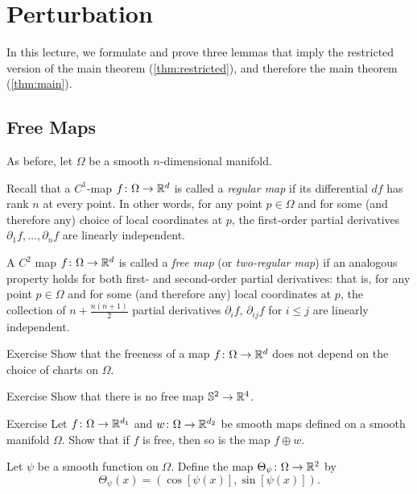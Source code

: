 \chapter{Perturbation}

In this lecture, we formulate and prove three lemmas that imply the restricted version of the main theorem (\ref{thm:restricted}), and therefore the main theorem (\ref{thm:main}).

\section{Free Maps}

As before, let $\Omega$ be a smooth $n$-dimensional manifold.

Recall that a $C^1$-map $f\colon\Omega \to \mathbb{R}^d$ is called a \emph{regular map} if its differential $df$ has rank $n$ at every point.
In other words, for any point $p\in \Omega$ and for some (and therefore any) choice of local coordinates at $p$, the first-order partial derivatives $\partial_1 f,\dots,\partial_n f$ are linearly independent.

A $C^2$ map $f\colon\Omega \to \mathbb{R}^d$ is called a \emph{free map} (or \emph{two-regular map}) if an analogous property holds for both first- and second-order partial derivatives:
that is, for any point $p\in \Omega$ and for some (and therefore any) local coordinates at $p$, the collection of $n + \tfrac{n(n+1)}{2}$ partial derivatives
$\partial_if$,
$\partial_{ij}f$ for $i\le j$
are linearly independent.

\begin{thm}{Exercise}\label{ex:free-free}
Show that the freeness of a map $f\colon\Omega \to \mathbb{R}^d$ does not depend on the choice of charts on $\Omega$.
\end{thm}

\begin{thm}{Exercise}\label{ex:free-dim}
Show that there is no free map $\mathbb{S}^2\to \mathbb{R}^4$.
\end{thm}

\begin{thm}{Exercise}\label{ex:free-sum}
Let $f\colon\Omega\to \mathbb{R}^{d_1}$ and $w\colon\Omega\to \mathbb{R}^{d_2}$ be smooth maps defined on a smooth manifold $\Omega$.
Show that if $f$ is free, then so is the map $f \oplus w$.
\end{thm}

Let $\psi$ be a smooth function on $\Omega$.
Define the map $\Theta_\psi\colon\Omega \to \mathbb{R}^2$ by
\[\Theta_\psi(x)=(\cos [\psi(x)],\sin [\psi(x)]).\]

